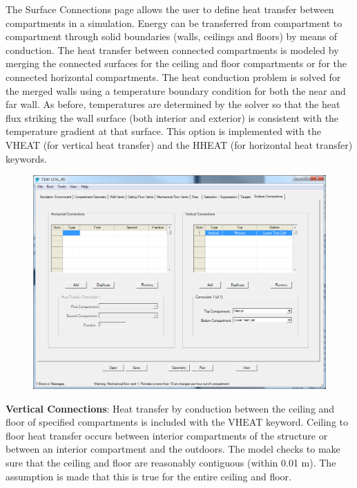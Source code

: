 The Surface Connections page allows the user to define heat transfer between compartments in a simulation. Energy can be transferred from compartment to compartment through solid boundaries (walls, ceilings and floors) by means of conduction. The heat transfer between connected compartments is modeled by merging the connected surfaces for the ceiling and floor compartments or for the connected horizontal compartments.  The heat conduction problem is solved for the merged walls using a temperature boundary condition for both the near and far wall. As before, temperatures are determined by the solver so that the heat flux striking the wall surface (both interior and exterior) is consistent with the temperature gradient at that surface.  This option is implemented with the VHEAT (for vertical heat transfer) and the HHEAT (for horizontal heat transfer) keywords.

\begin{figure}[h!]
\begin{center}
\includegraphics[width=6.5in]{FIGURES/Input_File/Surface_Connection_Tab}
\end{center}
\end{figure}

\textbf{Vertical Connections}: Heat transfer by conduction  between the ceiling and floor of specified compartments is included with the VHEAT keyword. Ceiling to floor heat transfer occurs between interior compartments of the structure or between an interior compartment and the outdoors. The model checks to make sure that the ceiling and floor are reasonably contiguous (within 0.01 m).  The assumption is made that this is true for the entire ceiling and floor. \\~ \\

